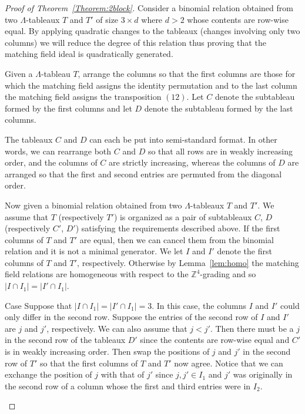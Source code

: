 \begin{proof}[Proof of Theorem~\ref{Theorem:2block}]

Consider a binomial relation obtained from two $\Lambda$-tableaux $T$ and $T'$ of size $3 \times d$ where $d >2$ whose contents are row-wise equal. By applying quadratic changes to the tableaux (changes involving only two columns) we will reduce the degree of this relation thus proving that the matching field ideal is quadratically generated. 

Given a $\Lambda$-tableau $T$, arrange the columns so that the first columns are those for which the matching field assigns the identity permutation and to the last column the matching field assigns the transposition $(12)$. Let $C$ denote the subtableau formed by the first columns and let $D$ denote the subtableau formed by the last columns. 

The tableaux $C$ and $D$ can each be put into semi-standard format. 
In other words, we can rearrange both $C$ and $D$ so that all rows are in weakly increasing order, and the columns of $C$ are strictly increasing, whereas the columns of $D$ are arranged so that the first and second entries are permuted from the diagonal order. 

Now given a binomial relation obtained from two $\Lambda$-tableaux $T$ and $T'$. We assume that $T$ (respectively $T'$) is organized as a pair of subtableaux $C$, $D$ (respectively $C'$, $D'$) satisfying the requirements described above. 
 If the first columns of $T$ and $T'$ are equal, then we can cancel them from the binomial relation and it is not a minimal generator. 
 We let $I$ and $I'$ denote the first columns of $T$ and $T'$, respectively. 
Otherwise by Lemma~\ref{lem:homo} the matching field relations are homogeneous with respect to the $\mathbb{Z}^4$-grading and so $\lvert I \cap I_1 \rvert = \lvert I' \cap I_1\rvert$.

\let\oldthecdrthm\thecdrthm
\setcounter{cdrthm}{0}
\def\thecdrthm{\arabic{cdrthm}}
\begin{enonce}[remark]{Case}\label{Case1}%
Suppose that $\lvert I \cap I_1 \rvert = \lvert I' \cap I_1\rvert = 3$. In this case, the columns $I$ and $I'$ could only differ in the second row. Suppose the entries of the second row of $I$ and $I'$ are $j $ and $j'$, respectively. We can also assume that $j <j'$. 
Then there must be a $j$ in the second row of the tableaux $D'$ since the contents are row-wise equal and $C'$ is in weakly increasing order. Then swap the positions of $j$ and $j'$ in the second row of $T'$ so that the first columns of $T$ and $T'$ now agree. Notice that we can exchange the position of $j$ with that of $j'$ since $j, j' \in I_1$ and $j'$ was originally in the second row of a column whose the first and third entries were in $I_2$. 
\end{enonce}


\end{proof}
